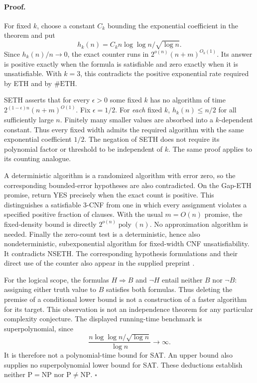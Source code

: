 \paragraph{Proof.}
For fixed \(k\), choose a constant \(C_k\) bounding the exponential
coefficient in the theorem and put
\[
 h_k(n)=C_k n\log\log n/\sqrt{\log n}.
\]
Since \(h_k(n)/n\longrightarrow0\), the exact counter runs in
\(2^{o(n)}(n+m)^{O_k(1)}\). Its answer is positive exactly when the
formula is satisfiable and zero exactly when it is unsatisfiable.
With \(k=3\), this contradicts the positive exponential rate required
by ETH and by \(\#\mathrm{ETH}\).

SETH asserts that for every \(\epsilon>0\) some fixed \(k\) has no
algorithm of time
\(2^{(1-\epsilon)n}(n+m)^{O(1)}\).
Fix \(\epsilon=1/2\). For \emph{each} fixed \(k\),
\(h_k(n)\leq n/2\) for all sufficiently large \(n\).
Finitely many smaller values are absorbed into a \(k\)-dependent
constant. Thus every fixed width admits the required algorithm with
the same exponential coefficient \(1/2\). The negation of SETH does
not require its polynomial factor or threshold to be independent of
\(k\). The same proof applies to its counting analogue.

A deterministic algorithm is a randomized algorithm with error zero,
so the corresponding bounded-error hypotheses are also contradicted.
On the Gap-ETH promise, return YES precisely when the exact count is
positive. This distinguishes a satisfiable 3-CNF from one in which every
assignment violates a specified positive fraction of clauses. With
the usual \(m=O(n)\) promise, the fixed-density bound is directly
\(2^{o(n)}\operatorname{poly}(n)\). No approximation algorithm is
needed. Finally the zero-count test is a deterministic, hence also
nondeterministic, subexponential algorithm for fixed-width CNF
unsatisfiability. It contradicts NSETH.
The corresponding hypothesis formulations and their direct use of the
counter also appear in the supplied preprint
\cite[\S1.1.1--\S1.1.3]{OpenAIETH}.

For the logical scope, the formulas \(H\Rightarrow B\) and \(\neg H\)
entail neither \(B\) nor \(\neg B\): assigning either truth value to
\(B\) satisfies both formulas. Thus deleting the premise of a
conditional lower bound is not a construction of a faster algorithm
for its target. This observation is not an independence theorem for
any particular complexity conjecture.
The displayed running-time benchmark is superpolynomial, since
\[
 \frac{n\log\log n/\sqrt{\log n}}{\log n}\longrightarrow\infty.
\]
It is therefore not a polynomial-time bound for SAT. An upper bound
also supplies no superpolynomial lower bound for SAT. These deductions
establish neither \(\mathrm P=\mathrm{NP}\) nor
\(\mathrm P\ne\mathrm{NP}\).
\hfill\(\square\)

